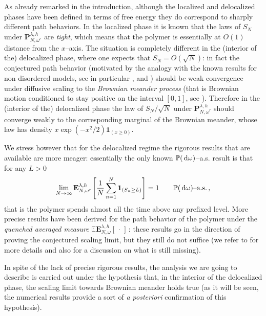 \documentclass[reqno,11pt]{amsart}
\numberwithin{equation}{section}
\newcommand{\ind}{\mathbf{1}}
\newcommand{\bP}{{\ensuremath{\mathbf P}} }
\newcommand{\bE}{{\ensuremath{\mathbf E}} }
\newcommand{\dd}{\,\text{\rm d}}             %
\newcommand{\bbE}{{\ensuremath{\mathbb E}} }
\newcommand{\bbP}{{\ensuremath{\mathbb P}} }
\newcommand{\go}{\omega}
\newcommand{\gl}{\lambda}
\begin{document}
As already remarked in the introduction, although the localized and delocalized phases have been defined in terms of free energy they do correspond to sharply different path behaviors. In the localized phase it is known \cite{cf:Sinai,cf:BisdH} that the laws of $S_N$ under $\bP_{N,\go^r}^{\gl,h}$ are \textsl{tight}, which means that the polymer is essentially at $O(1)$ distance from the $x$--axis. The situation is completely different in the (interior of the) delocalized phase, where one expects that $S_N = O(\sqrt{N})$: in fact the conjectured path behavior (motivated by the analogy with the known results for non disordered models, see in particular \cite{cf:MGO},  \cite{cf:DGZ} and \cite{cf:CGZ}) should be weak convergence under diffusive scaling to the \textsl{Brownian meander process} (that is Brownian motion conditioned to stay positive on the interval $[0,1]$, see \cite{cf:RevYor}). Therefore in the (interior of the) delocalized phase the law of $S_N/\sqrt{N}$ under $\bP_{N,\go^r}^{\gl,h}$ should converge weakly to the corresponding marginal of the Brownian meander, whose law has density $x \exp(-x^2/2) \ind_{(x\ge 0)}$.

We stress however that for the delocalized regime the rigorous results that are available are more meager: essentially the only known $\bbP(\dd\go)$--a.s. result is that for any $L>0$
\begin{equation}
    \lim_{N\to\infty} \bE_{N,\go^r}^{\gl,h} \Bigg[ \frac 1N \sum_{n=1}^N \ind_{(S_n \ge L)} \Bigg] = 1 \qquad \bbP(\dd\go)\text{--a.s.}\,,
\end{equation}
that is the polymer spends almost all the time above any prefixed level. More precise results have been derived for the path behavior of the polymer under the \textsl{quenched averaged measure} $\bbE \bE_{N,\go}^{\gl,h} [\,\cdot\, ]$\,: these results go in the direction of proving the conjectured scaling limit, but they still do not suffice (we refer to \cite{cf:GT} for more details and also for a discussion on what is still missing).

In spite of the lack of precise rigorous results,
the analysis we are going to describe is carried out under the hypothesis that, in the interior of the delocalized phase, the scaling limit towards Brownian meander holds true (as it will be seen, the numerical results provide a sort of \textsl{a posteriori} confirmation of this hypothesis).
\end{document}
